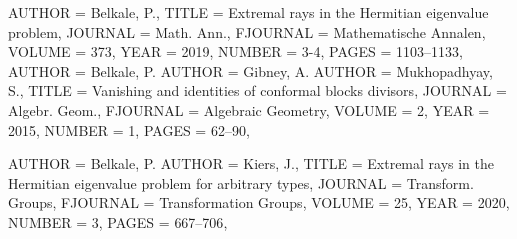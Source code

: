 \begin{bibdiv}
\begin{biblist}
 {
    AUTHOR = {Belkale, P.},
     TITLE = {Extremal rays in the {H}ermitian eigenvalue problem},
   JOURNAL = {Math. Ann.},
  FJOURNAL = {Mathematische Annalen},
    VOLUME = {373},
      YEAR = {2019},
    NUMBER = {3-4},
     PAGES = {1103--1133},
}
 {
    AUTHOR = {Belkale, P.}
    AUTHOR = {Gibney, A.}
    AUTHOR = {Mukhopadhyay,
              S.},
     TITLE = {Vanishing and identities of conformal blocks divisors},
   JOURNAL = {Algebr. Geom.},
  FJOURNAL = {Algebraic Geometry},
    VOLUME = {2},
      YEAR = {2015},
    NUMBER = {1},
     PAGES = {62--90},
}


 {
    AUTHOR = {Belkale, P. }
    AUTHOR = {Kiers, J.},
     TITLE = {Extremal rays in the {H}ermitian eigenvalue problem for
              arbitrary types},
   JOURNAL = {Transform. Groups},
  FJOURNAL = {Transformation Groups},
    VOLUME = {25},
      YEAR = {2020},
    NUMBER = {3},
     PAGES = {667--706},
}


\end{biblist}
\end{bibdiv}
